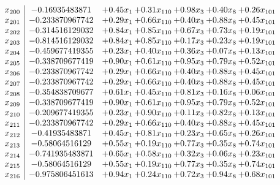 \documentclass[8pt]{article}
\begin{document}
\[\begin{array}{c| c c@{\hskip 2pt} c@{\hskip 2pt} c@{\hskip 2pt} c@{\hskip 2pt} c@{\hskip 2pt} }
 x_{200}   &  -0.16935483871 & +  0.45 x_{1} & +  0.31 x_{110} & +  0.98 x_{3} & +  0.40 x_{8} & +  0.26 x_{101}\\
 x_{201}   &  -0.233870967742 & +  0.29 x_{1} & +  0.66 x_{110} & +  0.40 x_{3} & +  0.88 x_{8} & +  0.45 x_{101}\\
 x_{202}   &  -0.314516129032 & +  0.84 x_{1} & +  0.85 x_{110} & +  0.67 x_{3} & +  0.73 x_{8} & +  0.19 x_{101}\\
 x_{203}   &  -0.814516129032 & +  0.84 x_{1} & +  0.85 x_{110} & +  0.17 x_{3} & +  0.23 x_{8} & +  0.19 x_{101}\\
 x_{204}   &  -0.459677419355 & +  0.23 x_{1} & +  0.40 x_{110} & +  0.36 x_{3} & +  0.07 x_{8} & +  0.13 x_{101}\\
 x_{205}   &  -0.338709677419 & +  0.90 x_{1} & +  0.61 x_{110} & +  0.95 x_{3} & +  0.79 x_{8} & +  0.52 x_{101}\\
 x_{206}   &  -0.233870967742 & +  0.29 x_{1} & +  0.66 x_{110} & +  0.40 x_{3} & +  0.88 x_{8} & +  0.45 x_{101}\\
 x_{207}   &  -0.233870967742 & +  0.29 x_{1} & +  0.66 x_{110} & +  0.40 x_{3} & +  0.88 x_{8} & +  0.45 x_{101}\\
 x_{208}   &  -0.354838709677 & +  0.61 x_{1} & +  0.45 x_{110} & +  0.81 x_{3} & +  0.16 x_{8} & +  0.06 x_{101}\\
 x_{209}   &  -0.338709677419 & +  0.90 x_{1} & +  0.61 x_{110} & +  0.95 x_{3} & +  0.79 x_{8} & +  0.52 x_{101}\\
 x_{210}   &  -0.209677419355 & +  0.23 x_{1} & +  0.90 x_{110} & +  0.11 x_{3} & +  0.82 x_{8} & +  0.13 x_{101}\\
 x_{211}   &  -0.233870967742 & +  0.29 x_{1} & +  0.66 x_{110} & +  0.40 x_{3} & +  0.88 x_{8} & +  0.45 x_{101}\\
 x_{212}   &  -0.41935483871 & +  0.45 x_{1} & +  0.81 x_{110} & +  0.23 x_{3} & +  0.65 x_{8} & +  0.26 x_{101}\\
 x_{213}   &  -0.58064516129 & +  0.55 x_{1} & +  0.19 x_{110} & +  0.77 x_{3} & +  0.35 x_{8} & +  0.74 x_{101}\\
 x_{214}   &  -0.741935483871 & +  0.65 x_{1} & +  0.58 x_{110} & +  0.32 x_{3} & +  0.06 x_{8} & +  0.23 x_{101}\\
 x_{215}   &  -0.58064516129 & +  0.55 x_{1} & +  0.19 x_{110} & +  0.77 x_{3} & +  0.35 x_{8} & +  0.74 x_{101}\\
 x_{216}   &  -0.975806451613 & +  0.94 x_{1} & +  0.24 x_{110} & +  0.72 x_{3} & +  0.94 x_{8} & +  0.68 x_{101}\\

\end{array}\]
\end{document}
